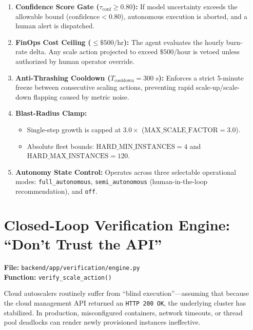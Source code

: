 \documentclass[11pt,letterpaper]{article}
\begin{document}
\begin{enumerate}[itemsep=4pt]
  \item \textbf{Confidence Score Gate ($\tau_{\text{conf}} \ge 0.80$):} If model uncertainty exceeds the allowable bound ($\text{confidence} < 0.80$), autonomous execution is aborted, and a human alert is dispatched.
  \item \textbf{FinOps Cost Ceiling ($\le \$500/\text{hr}$):} The agent evaluates the hourly burn-rate delta. Any scale action projected to exceed $\$500/\text{hour}$ is vetoed unless authorized by human operator override.
  \item \textbf{Anti-Thrashing Cooldown ($T_{\text{cooldown}} = 300\text{ s}$):} Enforces a strict 5-minute freeze between consecutive scaling actions, preventing rapid scale-up/scale-down flapping caused by metric noise.
  \item \textbf{Blast-Radius Clamp:}
  \begin{itemize}[itemsep=1pt]
    \item Single-step growth is capped at $3.0\times$ ($\text{MAX\_SCALE\_FACTOR} = 3.0$).
    \item Absolute fleet bounds: $\text{HARD\_MIN\_INSTANCES} = 4$ and $\text{HARD\_MAX\_INSTANCES} = 120$.
  \end{itemize}
  \item \textbf{Autonomy State Control:} Operates across three selectable operational modes: \texttt{full\_autonomous}, \texttt{semi\_autonomous} (human-in-the-loop recommendation), and \texttt{off}.
\end{enumerate}

\section{Closed-Loop Verification Engine: ``Don't Trust the API''}
\textbf{File:} \texttt{backend/app/verification/engine.py} \\
\textbf{Function:} \texttt{verify\_scale\_action()}

\noindent Cloud autoscalers routinely suffer from ``blind execution''---assuming that because the cloud management API returned an \texttt{HTTP 200 OK}, the underlying cluster has stabilized. In production, misconfigured containers, network timeouts, or thread pool deadlocks can render newly provisioned instances ineffective.
\end{document}
